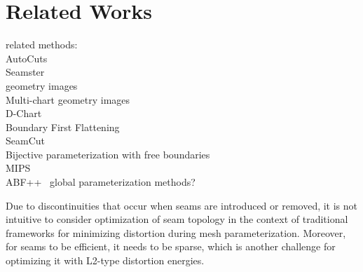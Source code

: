 
\section{Related Works}

related methods:\\
AutoCuts~\cite{Poranne2017Autocuts}\\
Seamster~\cite{Sheffer2002Seamster}\\
geometry images~\cite{Gu2002Geometry}\\
Multi-chart geometry images~\cite{Snyder2003Multi}\\
D-Chart~\cite{Julius2005D}\\
Boundary First Flattening~\cite{Sawhney:2017}\\
SeamCut~\cite{Lucquin:2017}\\
Bijective parameterization with free boundaries~\cite{Smith2015Bijective}\\
MIPS~\cite{Hormann2000MIPS}\\
ABF++~\cite{Sheffer2005ABFPP}
global parameterization methods?

Due to discontinuities that occur when seams are introduced or removed, it is not intuitive to consider optimization of seam topology in the context of traditional frameworks for minimizing distortion during mesh parameterization.
%
Moreover, for seams to be efficient, it needs to be sparse, which is another challenge for optimizing it with L2-type distortion energies.


